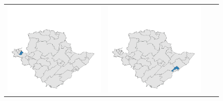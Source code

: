 \begin{figure}[p]
\begin{tabularx}{1\textwidth}{XXXX}
\includegraphics[width=1\linewidth]{images/ch6/mergeoverall/03}&
\includegraphics[width=1\linewidth]{images/ch6/mergeoverall/04} \\

\end{tabularx}
\end{figure}
